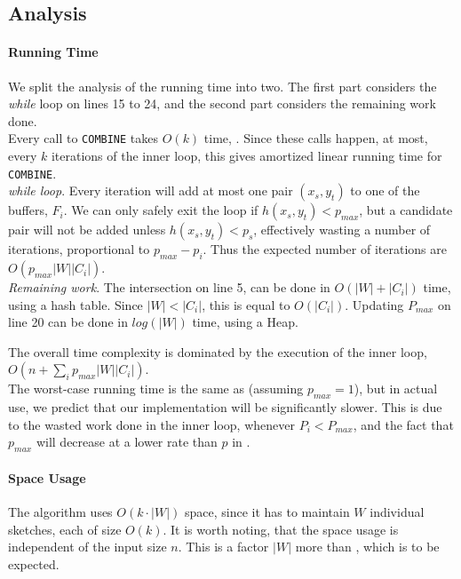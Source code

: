 \documentclass[a4paper,11pt]{article}
\begin{document}
\subsection{Analysis}
\paragraph {Running Time}
We split the analysis of the running time into two.
The first part considers the \emph{while} loop on lines 15 to 24, and the second part considers the remaining work done.\\

Every call to \texttt{COMBINE} takes $O(k)$ time, \cite{paper:amossen}. Since these calls happen, at most, every $k$ iterations of the inner loop, this gives amortized linear running time for \texttt{COMBINE}.\\

\textit{while loop}. Every iteration will add at most one pair $(x_s, y_t)$ to one of the buffers, $F_i$. We can only safely exit the loop if $h(x_s, y_t) < p_{max}$, but a candidate pair will not be added unless $h(x_s, y_t) < p_s$, effectively wasting a number of iterations, proportional to $p_{max}-p_i$. Thus the expected number of iterations are $O(p_{max}|W||C_i|)$.\\

\textit{Remaining work}.
The intersection on line 5, can be done in $O(|W|+|C_i|)$ time, using a hash table. Since $|W|<|C_i|$, this is equal to $O(|C_i|)$.
Updating $P_{max}$ on line 20 can be done in $log(|W|)$ time, using a Heap.

The overall time complexity is dominated by the execution of the inner loop, $O(n + \sum_i p_{max}|W||C_i|)$.\\

The worst-case running time is the same as \cite{paper:amossen} (assuming $p_{max} = 1$), but in actual use, we predict that our implementation will be significantly slower. This is due to the wasted work done in the inner loop, whenever $P_i < P_{max}$, and the fact that $p_{max}$ will decrease at a lower rate than $p$ in \cite{paper:amossen}.

\paragraph{Space Usage}
The algorithm uses $O(k\cdot|W|)$ space, since it has to maintain $W$ individual sketches, each of size $O(k)$. It is worth noting, that the space usage is independent of the input size $n$. This is a factor $|W|$ more than \cite{paper:amossen}, which is to be expected.
\end{document}
